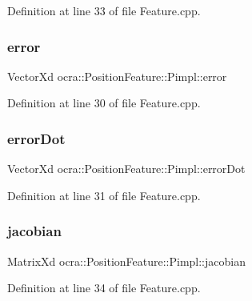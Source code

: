 Definition at line 33 of file Feature.\+cpp.

\hypertarget{structocra_1_1PositionFeature_1_1Pimpl_ab0c14028446505c11d15d0dfce51b97a}{}\label{structocra_1_1PositionFeature_1_1Pimpl_ab0c14028446505c11d15d0dfce51b97a} 
\subsubsection{\texorpdfstring{error}{error}}
{\footnotesize\ttfamily Vector\+Xd ocra\+::\+Position\+Feature\+::\+Pimpl\+::error}



Definition at line 30 of file Feature.\+cpp.

\hypertarget{structocra_1_1PositionFeature_1_1Pimpl_a3bff7b8d61a5575a68503d6767478950}{}\label{structocra_1_1PositionFeature_1_1Pimpl_a3bff7b8d61a5575a68503d6767478950} 
\subsubsection{\texorpdfstring{error\+Dot}{errorDot}}
{\footnotesize\ttfamily Vector\+Xd ocra\+::\+Position\+Feature\+::\+Pimpl\+::error\+Dot}



Definition at line 31 of file Feature.\+cpp.

\hypertarget{structocra_1_1PositionFeature_1_1Pimpl_a9cd18a0039e2ebbce05d78403667dd02}{}\label{structocra_1_1PositionFeature_1_1Pimpl_a9cd18a0039e2ebbce05d78403667dd02} 
\subsubsection{\texorpdfstring{jacobian}{jacobian}}
{\footnotesize\ttfamily Matrix\+Xd ocra\+::\+Position\+Feature\+::\+Pimpl\+::jacobian}



Definition at line 34 of file Feature.\+cpp.

